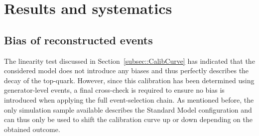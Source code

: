 \section{Results and systematics} \label{sec::Meas}

\subsection{Bias of reconstructed events}
The linearity test discussed in Section~\ref{subsec::CalibCurve} has indicated that the considered model does not introduce any biases and thus perfectly describes the decay of the top-quark. However, since this calibration has been determined using generator-level events, a final cross-check is required to ensure no bias is introduced when applying the full event-selection chain.
As mentioned before, the only simulation sample available describes the Standard Model configuration and can thus only be used to shift the calibration curve up or down depending on the obtained outcome.
\\
